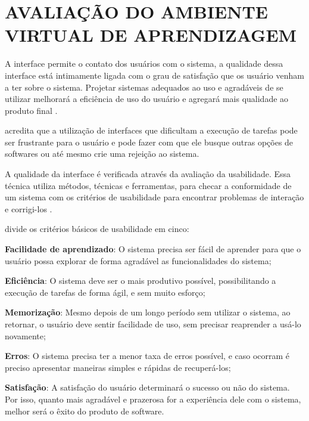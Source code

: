 \chapter{AVALIA\c{C}\~AO DO AMBIENTE VIRTUAL DE APRENDIZAGEM}
\label{chap:avaliacao-ambiente-virtual-aprendizagem}
\setcounter{table}{0}

A interface permite o contato dos usu\'arios com o sistema, a qualidade dessa interface est\'a intimamente ligada com o grau de 
satisfa\c{c}\~ao que os usu\'ario venham a ter sobre o sistema. Projetar sistemas adequados ao uso e agrad\'aveis de se utilizar
melhorar\'a a efici\^encia de uso do usu\'ario e agregará mais qualidade ao produto final \cite{antonino2015avaliacao}. 

 acredita que a utiliza\c{c}\~ao de interfaces que dificultam a execu\c{c}\~ao de tarefas 
pode ser frustrante para o usu\'ario e pode fazer com que ele busque outras op\c{c}\~oes de softwares ou at\'e mesmo crie uma 
rejei\c{c}\~ao ao sistema. 

A qualidade da interface \'e verificada atrav\'es da avalia\c{c}\~ao da usabilidade. Essa técnica utiliza m\'etodos, t\'ecnicas e 
ferramentas, para checar a conformidade de um sistema com os crit\'erios de usabilidade para encontrar problemas de intera\c{c}\~ao e 
corrigi-los \cite{antonino2015avaliacao}. 

 divide os critérios básicos de usabilidade em cinco:

\begin{alineascomponto}
	\item \textbf{Facilidade de aprendizado}: O sistema precisa ser fácil de aprender para que o usuário possa explorar de forma agradável as 
funcionalidades do sistema;
	\item \textbf{Eficiência}: O sistema deve ser o mais produtivo possível, possibilitando a execução de tarefas de forma ágil, e sem muito esforço;
	\item \textbf{Memorização}: Mesmo depois de um longo período sem utilizar o sistema, ao retornar, o usuário deve sentir facilidade de uso, sem 
precisar reaprender a usá-lo novamente;
	\item \textbf{Erros}: O sistema precisa ter a menor taxa de erros possível, e caso ocorram é preciso apresentar maneiras simples e rápidas de 
recuperá-los;
	\item \textbf{Satisfação}: A satisfação do usuário determinará o sucesso ou não do sistema. Por isso, quanto mais agradável e prazerosa for a experiência dele com o sistema, melhor será o êxito do produto de software.
\end{alineascomponto}

